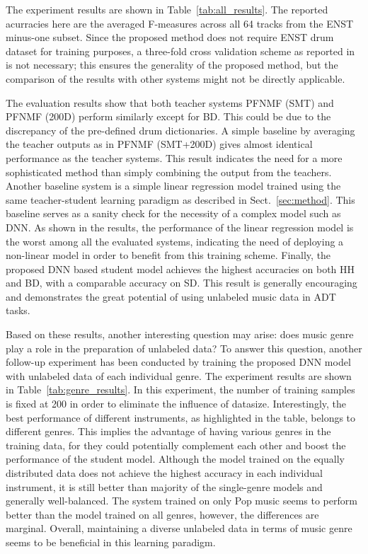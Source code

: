\documentclass{article}
\begin{document}
The experiment results are shown in Table~\ref{tab:all_results}. The reported acurracies here are the averaged F-measures across all 64 tracks from the ENST minus-one subset. Since the proposed method does not require ENST drum dataset for training purposes, a three-fold cross validation scheme as reported in \cite{Paulus2009a, Wu2015a, Vogl2016, Vogl2017, Southall2016} is not necessary; this ensures the generality of the proposed method, but the comparison of the results with other systems might not be directly applicable. 

The evaluation results show that both teacher systems PFNMF (SMT) and PFNMF (200D) perform similarly except for BD. This could be due to the discrepancy of the pre-defined drum dictionaries. A simple baseline by averaging the teacher outputs as in PFNMF (SMT+200D) gives almost identical performance as the teacher systems. This result indicates the need for a more sophisticated method than simply combining the output from the teachers. Another baseline system is a simple linear regression model trained using the same teacher-student learning paradigm as described in Sect.~\ref{sec:method}. This baseline serves as a sanity check for the necessity of a complex model such as DNN. As shown in the results, the performance of the linear regression model is the worst among all the evaluated systems, indicating the need of deploying a non-linear model in order to benefit from this training scheme. Finally, the proposed DNN based student model achieves the highest accuracies on both HH and BD, with a comparable accuracy on SD. This result is generally encouraging and demonstrates the great potential of using unlabeled music data in ADT tasks. 

Based on these results, another interesting question may arise: does music genre play a role in the preparation of unlabeled data? To answer this question, another follow-up experiment has been conducted by training the proposed DNN model with unlabeled data of each individual genre. The experiment results are shown in Table~\ref{tab:genre_results}. In this experiment, the number of training samples is fixed at 200 in order to eliminate the influence of datasize. Interestingly, the best performance of different instruments, as highlighted in the table, belongs to different genres. This implies the advantage of having various genres in the training data, for they could potentially complement each other and boost the performance of the student model. Although the model trained on the equally distributed data does not achieve the highest accuracy in each individual instrument, it is still better than majority of the single-genre models and generally well-balanced. The system trained on only Pop music seems to perform better than the model trained on all genres, however, the differences are marginal. Overall, maintaining a diverse unlabeled data in terms of music genre seems to be beneficial in this learning paradigm.
\end{document}
